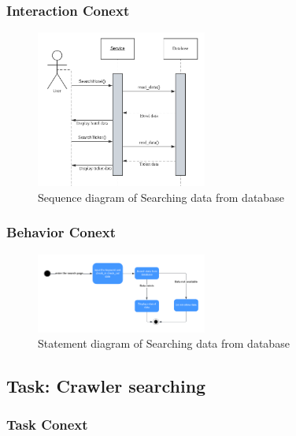 \documentclass[conference]{IEEEtran}
\begin{document}
\subsubsection{\textbf{Interaction Conext }}

\begin{figure}[htbp]
	\centerline{\includegraphics[width=0.5\textwidth]{image/searching hotel sequence1.pdf}}
	\caption{Sequence diagram of Searching data from database }
	\label{sequence1}
\end{figure}

\subsubsection{\textbf{Behavior Conext }}

\begin{figure}[htbp]
	\centerline{\includegraphics[width=0.5\textwidth]{image/searching hotel statement1.pdf}}
	\caption{Statement diagram of Searching data from database }
	\label{statement1}
\end{figure}

\subsection{\textbf{Task: Crawler searching }}


\subsubsection{\textbf{Task Conext }}
\end{document}
